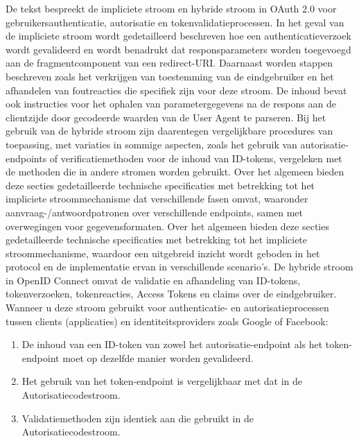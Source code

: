 \newline
De tekst bespreekt de impliciete stroom en hybride stroom in OAuth 2.0 voor gebruikersauthenticatie, autorisatie en tokenvalidatieprocessen. In het geval van de impliciete stroom wordt gedetailleerd beschreven hoe een authenticatieverzoek wordt gevalideerd en wordt benadrukt dat responsparameters worden toegevoegd aan de fragmentcomponent van een redirect-URI.
\newline
Daarnaast worden stappen beschreven zoals het verkrijgen van toestemming van de eindgebruiker en het afhandelen van foutreacties die specifiek zijn voor deze stroom. De inhoud bevat ook instructies voor het ophalen van parametergegevens na de respons aan de clientzijde door gecodeerde waarden van de User Agent te parseren.
\newline
Bij het gebruik van de hybride stroom zijn daarentegen vergelijkbare procedures van toepassing, met variaties in sommige aspecten, zoals het gebruik van autorisatie-endpoints of verificatiemethoden voor de inhoud van ID-tokens, vergeleken met de methoden die in andere stromen worden gebruikt.
\newline
Over het algemeen bieden deze secties gedetailleerde technische specificaties met betrekking tot het impliciete stroommechanisme dat verschillende fasen omvat, waaronder aanvraag-/antwoordpatronen over verschillende endpoints, samen met overwegingen voor gegevensformaten.
Over het algemeen bieden deze secties gedetailleerde technische specificaties met betrekking tot het impliciete stroommechanisme, waardoor een uitgebreid inzicht wordt geboden in het protocol en de implementatie ervan in verschillende scenario's.
\newline
De hybride stroom in OpenID Connect omvat de validatie en afhandeling van ID-tokens, tokenverzoeken, tokenreacties, Access Tokens en claims over de eindgebruiker. Wanneer u deze stroom gebruikt voor authenticatie- en autorisatieprocessen tussen clients (applicaties) en identiteitsproviders zoals Google of Facebook:
\newline
\begin{enumerate}
  \item De inhoud van een ID-token van zowel het autorisatie-endpoint als het token-endpoint moet op dezelfde manier worden gevalideerd.
  \item Het gebruik van het token-endpoint is vergelijkbaar met dat in de Autorisatiecodestroom.
  \item Validatiemethoden zijn identiek aan die gebruikt in de Autorisatiecodestroom.
\end{enumerate}
